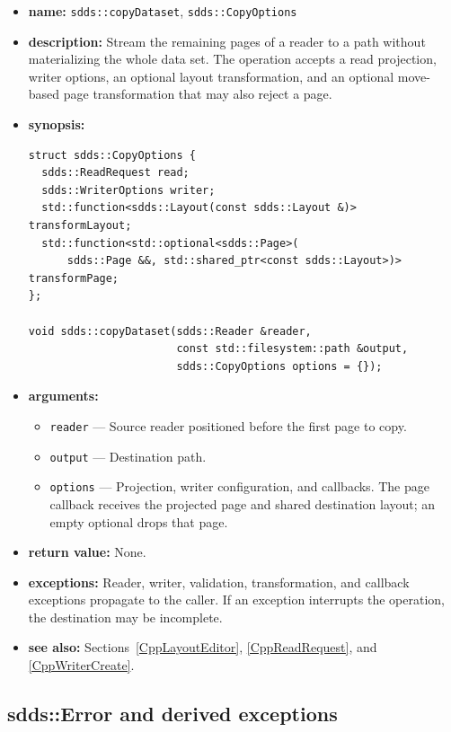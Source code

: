 \documentclass[11pt]{article}
\begin{document}
\begin{itemize}
\item {\bf name:}\newline
{\tt sdds::copyDataset}, {\tt sdds::CopyOptions}
\item {\bf description:}\newline
Stream the remaining pages of a reader to a path without materializing the
whole data set.  The operation accepts a read projection, writer options, an
optional layout transformation, and an optional move-based page transformation
that may also reject a page.
\item {\bf synopsis:}
\begin{verbatim}
struct sdds::CopyOptions {
  sdds::ReadRequest read;
  sdds::WriterOptions writer;
  std::function<sdds::Layout(const sdds::Layout &)> transformLayout;
  std::function<std::optional<sdds::Page>(
      sdds::Page &&, std::shared_ptr<const sdds::Layout>)> transformPage;
};

void sdds::copyDataset(sdds::Reader &reader,
                       const std::filesystem::path &output,
                       sdds::CopyOptions options = {});
\end{verbatim}
\item {\bf arguments:}
\begin{itemize}
\item {\tt reader} --- Source reader positioned before the first page to copy.
\item {\tt output} --- Destination path.
\item {\tt options} --- Projection, writer configuration, and callbacks.
The page callback receives the projected page and shared destination layout;
an empty optional drops that page.
\end{itemize}
\item {\bf return value:}\newline
None.
\item {\bf exceptions:}\newline
Reader, writer, validation, transformation, and callback exceptions propagate
to the caller.  If an exception interrupts the operation, the destination may
be incomplete.
\item {\bf see also:}\newline
Sections~\ref{CppLayoutEditor}, \ref{CppReadRequest}, and
\ref{CppWriterCreate}.
\end{itemize}

\subsection{sdds::Error and derived exceptions}
\label{CppErrors}
\end{document}
